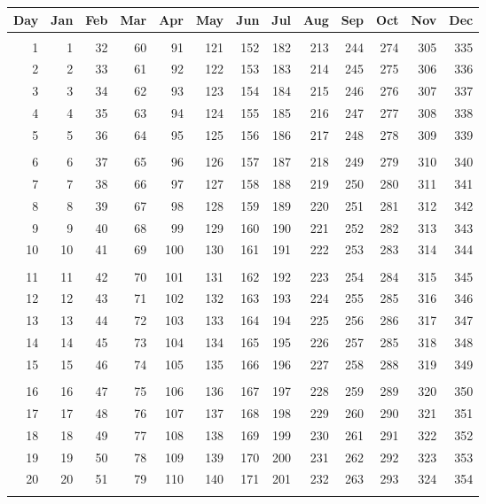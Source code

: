 \newpage
\begin{table}[!h]\centering
\vspace{0.25cm}
\begin{tabular}{r|rrrrrrrrrrrr}
Day & Jan & Feb & Mar & Apr & May & Jun & Jul & Aug & Sep & Oct& Nov & Dec\\\hline
&&&&&&&&&&&&\\[-1.5ex]
1 & 1 & 32 & 60 & 91 & 121& 152 & 182& 213& 244 & 274& 305& 335\\
2 & 2 & 33 & 61 & 92 & 122& 153& 183& 214& 245& 275& 306& 336\\
3 & 3&34 & 62& 93& 123& 154& 184& 215& 246& 276& 307& 337\\
4& 4& 35& 63& 94& 124& 155& 185& 216& 247& 277& 308& 338\\
5& 5&36& 64& 95& 125& 156& 186& 217& 248& 278& 309& 339\\
&&&&&&&&&&&&\\
6&6& 37& 65& 96& 126& 157& 187& 218& 249& 279& 310& 340\\
7&7 & 38 & 66 & 97& 127& 158& 188& 219& 250& 280& 311& 341\\
8& 8&39& 67& 98& 128& 159& 189& 220&251& 281& 312& 342\\
9&9&40&68&99&129& 160& 190& 221& 252& 282& 313& 343\\
10&10&41&69&100&130& 161& 191& 222& 253& 283&314&344\\
&&&&&&&&&&&&\\
11&11&42&70& 101& 131& 162& 192& 223& 254& 284& 315& 345\\
12& 12&43&71&102& 132& 163& 193& 224& 255& 285& 316& 346\\
13& 13& 44& 72& 103& 133&164& 194& 225& 256& 286& 317& 347\\
14& 14&45& 73& 104& 134& 165& 195& 226& 257& 285& 318& 348\\
15&15&46& 74& 105& 135& 166& 196& 227& 258& 288& 319& 349\\
&&&&&&&&&&&&\\
16& 16& 47& 75& 106& 136& 167& 197& 228& 259& 289& 320& 350\\
17& 17 & 48& 76& 107& 137& 168& 198& 229& 260& 290& 321& 351\\
18& 18& 49& 77& 108&138& 169& 199& 230& 261& 291& 322& 352\\
19& 19& 50& 78& 109& 139&170& 200& 231& 262& 292& 323& 353\\
20 & 20& 51& 79& 110& 140& 171& 201& 232& 263& 293& 324& 354\\
&&&&&&&&&&&&\\

\end{tabular}
\end{table}
